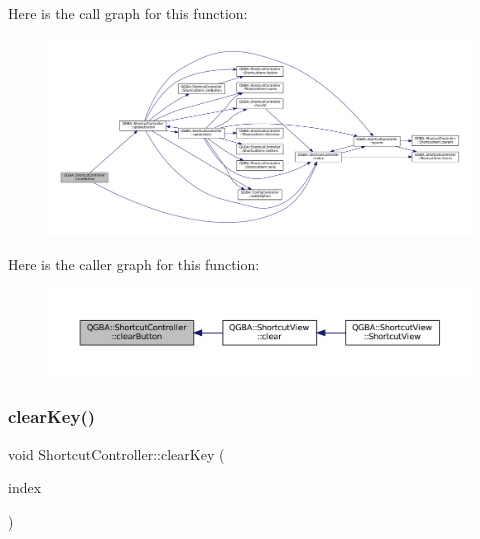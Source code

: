 Here is the call graph for this function\+:
\nopagebreak
\begin{figure}[H]
\begin{center}
\leavevmode
\includegraphics[width=350pt]{class_q_g_b_a_1_1_shortcut_controller_a0dee45b9b1236169cc78028924a60325_cgraph}
\end{center}
\end{figure}
Here is the caller graph for this function\+:
\nopagebreak
\begin{figure}[H]
\begin{center}
\leavevmode
\includegraphics[width=350pt]{class_q_g_b_a_1_1_shortcut_controller_a0dee45b9b1236169cc78028924a60325_icgraph}
\end{center}
\end{figure}
\mbox{\label{class_q_g_b_a_1_1_shortcut_controller_a167909d55afa7282830db1d7233e464e}} 
\subsubsection{\texorpdfstring{clear\+Key()}{clearKey()}}
{\footnotesize\ttfamily void Shortcut\+Controller\+::clear\+Key (\begin{DoxyParamCaption}\item[{const Q\+Model\+Index \&}]{index }\end{DoxyParamCaption})}

